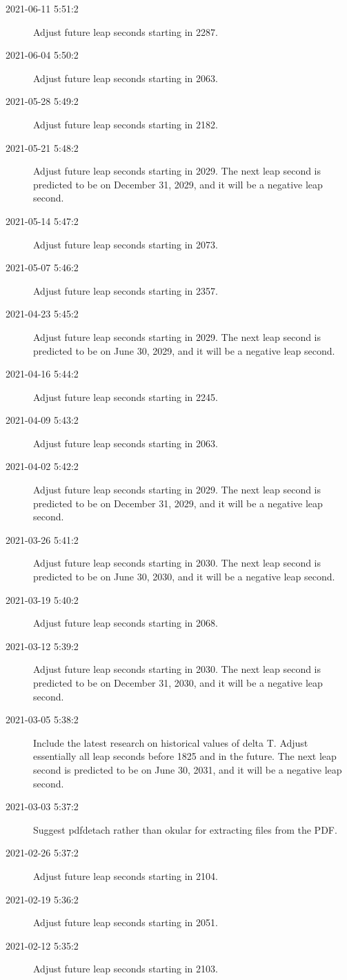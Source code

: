\documentclass[letterpaper,twoside]{article}
\begin{document}
\begin{description}
\item[2021-06-11 5:51:2]Adjust future leap seconds starting in 2287.
\item[2021-06-04 5:50:2]Adjust future leap seconds starting in 2063.
\item[2021-05-28 5:49:2]Adjust future leap seconds starting in 2182.
\item[2021-05-21 5:48:2]Adjust future leap seconds starting in 2029.
  The next leap second is predicted to be on December 31, 2029, and
  it will be a negative leap second.
\item[2021-05-14 5:47:2]Adjust future leap seconds starting in 2073.
\item[2021-05-07 5:46:2]Adjust future leap seconds starting in 2357.
\item[2021-04-23 5:45:2]Adjust future leap seconds starting in 2029.
  The next leap second is predicted to be on June 30, 2029, and
  it will be a negative leap second.
\item[2021-04-16 5:44:2]Adjust future leap seconds starting in 2245.
\item[2021-04-09 5:43:2]Adjust future leap seconds starting in 2063.
\item[2021-04-02 5:42:2]Adjust future leap seconds starting in 2029.
  The next leap second is predicted to be on December 31, 2029, and
  it will be a negative leap second.
\item[2021-03-26 5:41:2]Adjust future leap seconds starting in 2030.
  The next leap second is predicted to be on June 30, 2030, and
  it will be a negative leap second.
\item[2021-03-19 5:40:2]Adjust future leap seconds starting in 2068.
\item[2021-03-12 5:39:2]Adjust future leap seconds starting in 2030.
  The next leap second is predicted to be on December 31, 2030,
  and it will be a negative leap second.
\item[2021-03-05 5:38:2]Include the latest research on historical values
  of delta T.  Adjust essentially all leap seconds before 1825 and
  in the future.  The next leap second is predicted to be on June 30, 2031,
  and it will be a negative leap second.
\item[2021-03-03 5:37:2]Suggest pdfdetach rather than okular
  for extracting files from the PDF.
\item[2021-02-26 5:37:2]Adjust future leap seconds starting in 2104.
\item[2021-02-19 5:36:2]Adjust future leap seconds starting in 2051.
\item[2021-02-12 5:35:2]Adjust future leap seconds starting in 2103.

\end{description}
\end{document}
